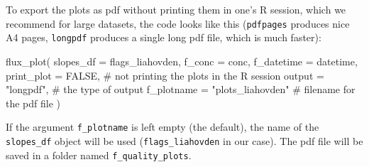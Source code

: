 \documentclass[
  letterpaper,
  DIV=11,
  numbers=noendperiod]{scrartcl}
\newenvironment{Shaded}{\begin{snugshade}}{\end{snugshade}}
\newcommand{\AttributeTok}[1]{\textcolor[rgb]{0.40,0.45,0.13}{#1}}
\newcommand{\CommentTok}[1]{\textcolor[rgb]{0.37,0.37,0.37}{#1}}
\newcommand{\ConstantTok}[1]{\textcolor[rgb]{0.56,0.35,0.01}{#1}}
\newcommand{\FunctionTok}[1]{\textcolor[rgb]{0.28,0.35,0.67}{#1}}
\newcommand{\NormalTok}[1]{\textcolor[rgb]{0.00,0.23,0.31}{#1}}
\newcommand{\StringTok}[1]{\textcolor[rgb]{0.13,0.47,0.30}{#1}}
\begin{document}
To export the plots as pdf without printing them in one's R session,
which we recommend for large datasets, the code looks like this
(\texttt{pdfpages} produces nice A4 pages, \texttt{longpdf} produces a
single long pdf file, which is much faster):

\begin{Shaded}
\begin{Highlighting}[]
  \FunctionTok{flux\_plot}\NormalTok{(}
    \AttributeTok{slopes\_df =}\NormalTok{ flags\_liahovden,}
    \AttributeTok{f\_conc =}\NormalTok{ conc,}
    \AttributeTok{f\_datetime =}\NormalTok{ datetime,}
    \AttributeTok{print\_plot =} \ConstantTok{FALSE}\NormalTok{, }\CommentTok{\# not printing the plots in the R session}
    \AttributeTok{output =} \StringTok{"longpdf"}\NormalTok{, }\CommentTok{\# the type of output}
    \AttributeTok{f\_plotname =} \StringTok{"plots\_liahovden"} \CommentTok{\# filename for the pdf file}
\NormalTok{  )}
\end{Highlighting}
\end{Shaded}

If the argument \texttt{f\_plotname} is left empty (the default), the
name of the \texttt{slopes\_df} object will be used
(\texttt{flags\_liahovden} in our case). The pdf file will be saved in a
folder named \texttt{f\_quality\_plots}.
\end{document}
